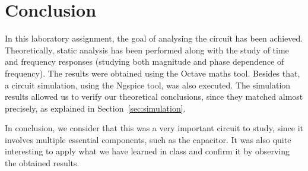 
\section{Conclusion}
\label{sec:conclusion}
\vspace{3mm}
\par In this laboratory assignment, the goal of analysing the circuit has been achieved. Theoretically, static analysis has been performed along with the study of time and frequency responses (studying both magnitude and phase dependence of frequency). The results were obtained using the Octave maths tool. Besides that, a circuit simulation, using the Ngspice tool, was also executed. The simulation results allowed us to verify our theoretical conclusions, since they matched almost precisely, as explained in Section~\ref{sec:simulation}.

\vspace{3mm}
\par In conclusion, we consider that this was a very important circuit to study, since it involves multiple essential components, such as the capacitor. It was also quite interesting to apply what we have learned in class and confirm it by observing the obtained results. 
